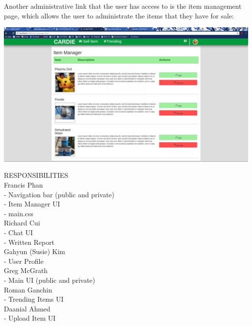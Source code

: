 \documentclass[10pt, titlepage]{article}
\begin{document}
\noindent Another administrative link that the user has access to is the item management page, which allows the user to administrate the items that they have for sale: \\

\centerline{\includegraphics[scale=.25]{screen_09}}

\pagebreak

\noindent RESPONSIBILITIES\\
Francis Phan\\
\indent - Navigation bar (public and private)\\
\indent - Item Manager UI\\
\indent - main.css\\
Richard Cui\\
\indent - Chat UI\\
\indent - Written Report\\
Gahyun (Susie) Kim\\
\indent - User Profile \\
Greg McGrath\\
\indent - Main UI (public and private)\\
Roman Ganchin\\
\indent - Trending Items UI\\
Daanial Ahmed\\
\indent - Upload Item UI\\
\end{document}
